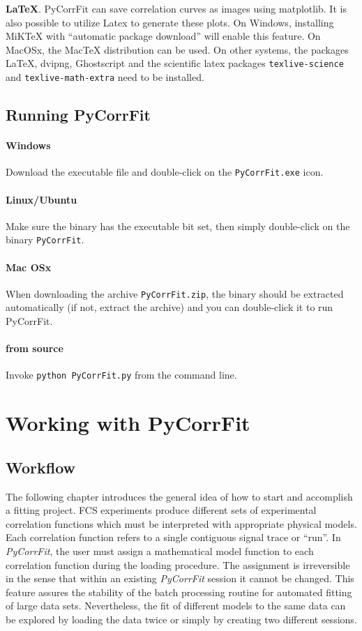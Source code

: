 \noindent \textbf{\LaTeX}.
PyCorrFit can save correlation curves as images using matplotlib. It is also possible to utilize Latex to generate these plots. On Windows, installing MiKTeX  with ``automatic package download'' will enable this feature. On MacOSx, the MacTeX distribution can be used. On other systems, the packages LaTeX, dvipng, Ghostscript and the scientific latex packages \texttt{texlive-science} and \texttt{texlive-math-extra} need to be installed.

\subsection{Running PyCorrFit}
\label{sec:run}
\paragraph*{Windows}
Download the executable file and double-click on the \texttt{PyCorrFit.exe} icon.
\paragraph*{Linux/Ubuntu}
Make sure the binary has the executable bit set, then simply double-click on the binary  \texttt{PyCorrFit}.
\paragraph*{Mac OSx}
When downloading the archive \texttt{PyCorrFit.zip}, the binary should be extracted automatically (if not, extract the archive) and you can double-click it to run PyCorrFit.
\paragraph*{from source}
Invoke \texttt{python PyCorrFit.py} from the command line.


\section{Working with PyCorrFit}

\subsection{Workflow}
\label{cha_graphint}
\label{sec:PyCorrFitUserInterface}

The following chapter introduces the general idea of how to start and accomplish a fitting project. FCS experiments produce different sets of experimental correlation functions which must be interpreted with appropriate physical models. Each correlation function refers to a single contiguous signal trace or ``run''. In \textit{PyCorrFit}, the user must assign a mathematical model function to each correlation function during the loading procedure. The assignment is irreversible in the sense that within an existing \textit{PyCorrFit} session it cannot be changed. This feature assures the stability of the batch processing routine for automated fitting of large data sets. Nevertheless, the fit of different models to the same data can be explored by loading the data twice or simply by creating two different sessions.

